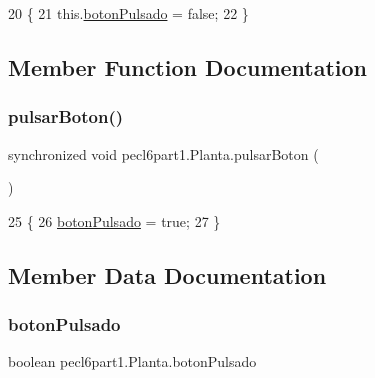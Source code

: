\begin{DoxyCode}
20     \{
21         this.\mbox{\hyperlink{classpecl6part1_1_1_planta_a9ce4c06f0a59be9998b7bf71a1fa94c1}{botonPulsado}} = \textcolor{keyword}{false};
22     \}
\end{DoxyCode}


\subsection{Member Function Documentation}
\mbox{\label{classpecl6part1_1_1_planta_a064fad4a92526db34d23f3cd8cbdbee8}} 
\subsubsection{\texorpdfstring{pulsar\+Boton()}{pulsarBoton()}}
{\footnotesize\ttfamily synchronized void pecl6part1.\+Planta.\+pulsar\+Boton (\begin{DoxyParamCaption}{ }\end{DoxyParamCaption})\hspace{0.3cm}{\ttfamily [inline]}}


\begin{DoxyCode}
25     \{
26         \mbox{\hyperlink{classpecl6part1_1_1_planta_a9ce4c06f0a59be9998b7bf71a1fa94c1}{botonPulsado}} = \textcolor{keyword}{true};
27     \}
\end{DoxyCode}


\subsection{Member Data Documentation}
\mbox{\label{classpecl6part1_1_1_planta_a9ce4c06f0a59be9998b7bf71a1fa94c1}} 
\subsubsection{\texorpdfstring{boton\+Pulsado}{botonPulsado}}
{\footnotesize\ttfamily boolean pecl6part1.\+Planta.\+boton\+Pulsado}

